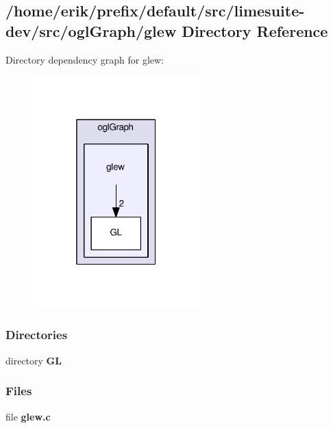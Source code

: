 \subsection{/home/erik/prefix/default/src/limesuite-\/dev/src/ogl\+Graph/glew Directory Reference}
\label{dir_f8cd41565ac6a6196a7b2b96f1ed983d}
Directory dependency graph for glew\+:
\nopagebreak
\begin{figure}[H]
\begin{center}
\leavevmode
\includegraphics[width=182pt]{dir_f8cd41565ac6a6196a7b2b96f1ed983d_dep}
\end{center}
\end{figure}
\subsubsection*{Directories}
\begin{DoxyCompactItemize}
\item 
directory {\bf GL}
\end{DoxyCompactItemize}
\subsubsection*{Files}
\begin{DoxyCompactItemize}
\item 
file {\bf glew.\+c}
\end{DoxyCompactItemize}
